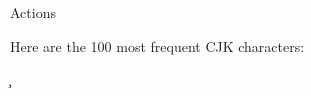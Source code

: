 




\vspace{\myLineheight}\begin{multicols}{2}\raggedcolumns{}

\end{multicols}


{\mktsHTwo{}Actions\mktsHTwoBeg}%


\vspace{\myLineheight}\begin{multicols}{2}\raggedcolumns{}Here are the 100 most frequent CJK characters:

\cjkgGlue{}\cjkgGlue{}\cjkgGlue{}\cjkgGlue{}\cjkgGlue{}\cjkgGlue{}\cjkgGlue{}\cjkgGlue{}\cjkgGlue{}\cjkgGlue{}\cjkgGlue{}\cjkgGlue{}\cjkgGlue{}\cjkgGlue{}\cjkgGlue{}\cjkgGlue{}\cjkgGlue{}\cjkgGlue{}\cjkgGlue{}\cjkgGlue{}\cjkgGlue{}\cjkgGlue{}\cjkgGlue{}\cjkgGlue{}\cjkgGlue{}\cjkgGlue{}\cjkgGlue{}\cjkgGlue{}\cjkgGlue{}\cjkgGlue{}\cjkgGlue{}\cjkgGlue{}\cjkgGlue{}\cjkgGlue{}\cjkgGlue{}\cjkgGlue{}\cjkgGlue{}\cjkgGlue{}\cjkgGlue{}\cjkgGlue{}\cjkgGlue{}\cjkgGlue{}\cjkgGlue{}\cjkgGlue{}\cjkgGlue{}\cjkgGlue{}\cjkgGlue{}\cjkgGlue{}\cjkgGlue{}\cjkgGlue{}\cjkgGlue{}\cjkgGlue{}\cjkgGlue{}\cjkgGlue{}\cjkgGlue{}\cjkgGlue{}\cjkgGlue{}\cjkgGlue{}\cjkgGlue{}\cjkgGlue{}\cjkgGlue{}\cjkgGlue{}\cjkgGlue{}\cjkgGlue{}\cjkgGlue{}\cjkgGlue{}\cjkgGlue{}\cjkgGlue{}\cjkgGlue{}\cjkgGlue{}\cjkgGlue{}\cjkgGlue{}\cjkgGlue{}\cjkgGlue{}\cjkgGlue{}\cjkgGlue{}\cjkgGlue{}\cjkgGlue{}\cjkgGlue{}\cjkgGlue{}\cjkgGlue{}\cjkgGlue{}\cjkgGlue{}\cjkgGlue{}\cjkgGlue{}\cjkgGlue{}\cjkgGlue{}\c
\end{multicols}
